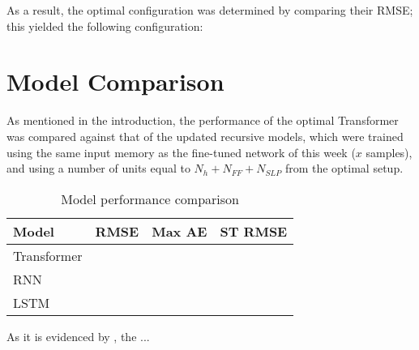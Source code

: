 \documentclass{scrartcl}
\begin{document}
    As a result, the optimal configuration was determined by comparing their RMSE; this yielded the following configuration: 

  \section{Model Comparison}

    As mentioned in the introduction, the performance of the optimal Transformer was compared against that of the updated recursive models, which were trained using the same input memory as the fine-tuned network of this week ($x$ samples), and using a number of units equal to $N_h + N_{FF} + N_{SLP}$ from the optimal setup.

    \begin{table}[ht]
      \centering
      \begin{tabular}{|l|l|l|l|}
        \hline
        Model       & RMSE & Max AE & ST RMSE \\ \hline
        Transformer &      &        &         \\ \hline
        RNN         &      &        &         \\ \hline
        LSTM        &      &        &         \\ \hline
      \end{tabular}
      \caption{Model performance comparison}
      \label{tb:comparison}
    \end{table}

    As it is evidenced by , the ...

  \printbibliography
\end{document}

